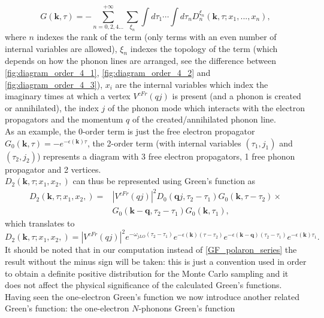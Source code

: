 \begin{equation}
    G(\mathbf{k},\tau)=-\sum_{n=0,2,4...}^{+\infty}\sum_{\xi_n}\int d\tau_1\cdots\int d\tau_n D_n^{\xi_n}(\mathbf{k},\tau;x_1,...,x_n),
    \label{GF_polaron_series}
\end{equation}
where $n$ indexes the rank of the term (only terms with an even number of internal variables are allowed), $\xi_n$ indexes the topology of the 
term (which depends on how the phonon lines are arranged, see the difference between \ref{fig:diagram_order_4_1}, \ref{fig:diagram_order_4_2} and 
\ref{fig:diagram_order_4_3}), $x_i$ are the internal variables which index the imaginary times at which a vertex $V^{cFr}(qj)$ is 
present (and a phonon is created or annihilated), the index $j$ of the phonon mode which interacts with the electron propagators and the momentum $q$ of the created/annihilated 
phonon line.\\
As an example, the 0-order term is just the free electron propagator $G_0(\mathbf{k},\tau)=-e^{-\epsilon(\mathbf{k})\tau}$, the 2-order term 
(with internal variables $(\tau_1,j_1)$ and $(\tau_2,j_2)$) represents a diagram with 3 free electron propagators, 1 free phonon propagator and 2 vertices.\\
$D_2(\mathbf{k},\tau;x_1,x_2,)$ can thus be represented using Green's function as
\begin{equation}
\begin{split}
    D_2(\mathbf{k},\tau;x_1,x_2,)=&|V^{cFr}(qj)|^2D_0(\mathbf{q}j,\tau_2-\tau_1)G_0(\mathbf{k},\tau-\tau_2)\times\\
    &G_0(\mathbf{k-q},\tau_2-\tau_1)G_0(\mathbf{k},\tau_1),
\end{split}
\end{equation}
which translates to
\begin{equation}
    D_2(\mathbf{k},\tau;x_1,x_2,)=|V^{cFr}(qj)|^2e^{-\omega_{jLO}(\tau_2-\tau_1)}e^{-\epsilon(\mathbf{k})(\tau-\tau_2)}e^{-\epsilon(\mathbf{k-q})(\tau_2-\tau_1)}e^{-\epsilon(\mathbf{k})\tau_1}.
\end{equation}
It should be noted that in our computation instead of \ref{GF_polaron_series} the result without the minus sign will be taken: this is just a convention 
used in order to obtain a definite positive distribution for the Monte Carlo sampling and it does not affect the physical significance of the calculated Green's functions.\\
Having seen the one-electron Green's function we now introduce another related Green's function: the one-electron $N$-phonons Green's function 
